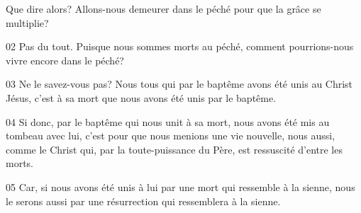 Que dire alors? Allons-nous demeurer dans le péché pour que la grâce se multiplie?

02 Pas du tout. Puisque nous sommes morts au péché, comment pourrions-nous vivre encore dans le péché?

03 Ne le savez-vous pas? Nous tous qui par le baptême avons été unis au Christ Jésus, c’est à sa mort que nous avons été unis par le baptême.

04 Si donc, par le baptême qui nous unit à sa mort, nous avons été mis au tombeau avec lui, c’est pour que nous menions une vie nouvelle, nous aussi, comme le Christ qui, par la toute-puissance du Père, est ressuscité d’entre les morts.

05 Car, si nous avons été unis à lui par une mort qui ressemble à la sienne, nous le serons aussi par une résurrection qui ressemblera à la sienne.
